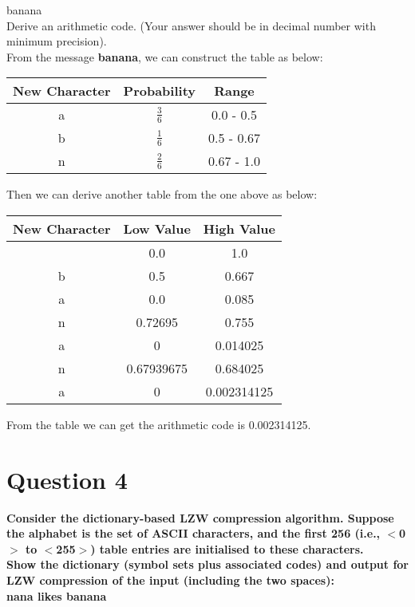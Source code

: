 \documentclass[a4paper]{article}
\begin{document}
\begin{spacing}{1.5}
\begin{description}
{      banana\\
      Derive an arithmetic code. (Your answer should be in decimal number with minimum precision).}\\
      From the message \textbf{banana}, we can construct the table as below:\\
      \begin{center}
        \begin{tabular}{ c c c }
          New Character & Probability & Range \\ \hline
          a & $\frac{3}{6}$ & 0.0 - 0.5 \\
          b & $\frac{1}{6}$ & 0.5 - 0.67 \\
          n & $\frac{2}{6}$ & 0.67 - 1.0 \\
        \end{tabular}
      \end{center}
      Then we can derive another table from the one above as below:
      \begin{center}
        \begin{tabular}{ c c c }
          New Character & Low Value & High Value \\ \hline
            & 0.0 & 1.0 \\
          b & 0.5 & 0.667 \\
          a & 0.0 & 0.085 \\
          n & 0.72695 & 0.755 \\
          a & 0 & 0.014025 \\
          n & 0.67939675 & 0.684025 \\
          a & 0 & 0.002314125 \\
        \end{tabular}
      \end{center}
      From the table we can get the arithmetic code is 0.002314125.
    \end{description}
  \end{spacing}
\section*{Question 4}
  \begin{spacing}{1.5}
    \textbf{Consider the dictionary-based LZW compression algorithm. Suppose the alphabet is the set of ASCII characters, and the first 256 (i.e., $<$0$>$ to $<$255$>$) table entries are initialised to these characters.\\
    Show the dictionary (symbol sets plus associated codes) and output for LZW compression of the input (including the two spaces):\\
    nana likes banana\\}

  \end{spacing}
\end{document}
